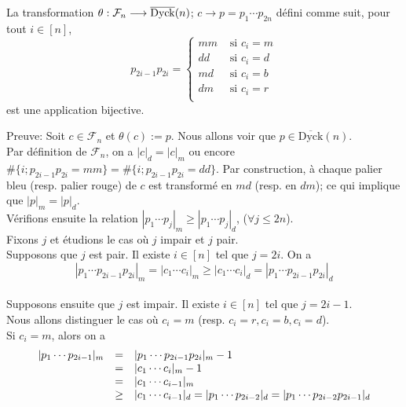 \begin{proposition} \label{bij-DyckBar}
	La transformation $\theta: \mathcal{F}_{n} \longrightarrow  \overline{\rm{Dyck}}(n)$; $c \longrightarrow p=p_{1}\cdots p_{2n}$ défini comme suit, pour tout $i \in [n]$,
	$$
		p_{2i-1}p_{2i}=\begin{cases}
			mm & \text{ si } c_{i}=m \\
			dd & \text{ si } c_{i}=d \\
			md & \text{ si } c_{i}=b \\
			dm & \text{ si } c_{i}=r \\
		\end{cases}
	$$
	est une application bijective.
\end{proposition}
Preuve: Soit $c\in \mathcal{F}_{n}$ et $\theta(c):=p$.
Nous allons voir que $p\in \overline{\text{Dyck}}(n) $.\\
Par définition de $\mathcal{F}_{n}$, on a $|c|_{d}=|c|_{m}$ ou encore \\$\#\{i; p_{2i-1}p_{2i}=mm\}=\#\{i; p_{2i-1}p_{2i}=dd\}$. Par construction, à chaque palier
bleu (resp. palier rouge) de $c$ est transformé en $md$ (resp. en $dm$); ce qui implique que $|p|_{m}=|p|_{d}$.\\
Vérifions ensuite la relation $|p_{1} \cdots p_{j}|_{m}\geq |p_{1} \cdots p_{j}|_{d}$, ($\forall j\leq 2n$).\\
Fixons $j$ et étudions le cas où $j$ impair et $j$ pair. \\
Supposons que $j$ est pair. Il existe $i\in [n]$ tel que $j=2i$. On a \vspace{5pt}\\
\[
	|p_{1} \cdots p_{2i-1}p_{2i}|_{m} = |c_{1} \cdots c_{i}|_{m}\geq |c_{1} \cdots c_{i}|_{d} = |p_{1} \cdots p_{2i-1}p_{2i}|_{d}
\]
\text{}\vspace{5pt}\\
Supposons ensuite que $j$ est impair. Il existe $i\in [n]$ tel que $j = 2i-1$.\\ Nous allons distinguer le cas où $c_{i} = m$ (resp. $c_{i}=r, c_{i}=b, c_{i}=d$).\\
Si $c_{i}=m$, alors on a \vspace{5pt}\\
\[
	\begin{array} {l l l}
		| p_{1}\cdots p_{2i-1} |_{m} & =    & | p_{1}\cdots p_{2i-1}p_{2i} |_{m} -1                                                           \\
		                             & =    & | c_{1}\cdots c_{i} |_{m} -1                                                                    \\
		                             & =    & | c_{1}\cdots c_{i-1} |_{m}                                                                     \\
		                             & \geq & | c_{1}\cdots c_{i-1} |_{d} =| p_{1}\cdots p_{2i-2} |_{d} =| p_{1}\cdots p_{2i-2}p_{2i-1} |_{d} \\
	\end{array}
\]
